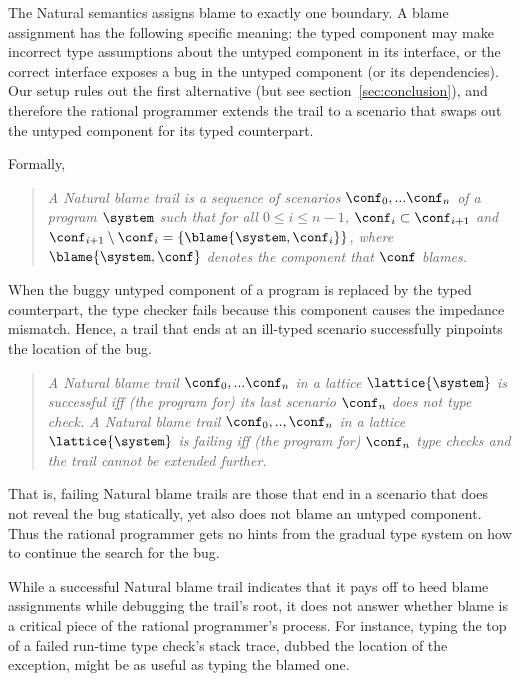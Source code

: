
The Natural semantics assigns blame to exactly one boundary.  A blame assignment
has the following specific meaning: the typed component may make incorrect type
assumptions about the untyped component in its interface, or the correct
interface exposes a bug in the untyped component (or its dependencies). Our setup rules out the first
alternative (but see section~\ref{sec:conclusion}), and therefore the rational
programmer extends the trail to a scenario that swaps out the untyped component
for its typed counterpart.

Formally,
\begin{quote}
\it A \emph{Natural blame trail} is a sequence of scenarios $\conf_0,...\conf_n$ of
a program $\system$ such that for all $0 \leq i \leq n - 1$, $\conf_i \subset
\conf_{i+1}$ and $\conf_{i+1} \setminus \conf_i =\{\blame{\system, \conf_i}\}$, where
$\blame{\system, \conf}$ denotes the component that $\conf$ blames.
\end{quote}

When the buggy untyped component of a program is replaced by the typed counterpart,
the type checker fails because this component causes the impedance mismatch. Hence, a
trail that ends at an ill-typed scenario successfully pinpoints the location of
the bug. 
\begin{quote}
\it A Natural blame trail $\conf_0,...\conf_n$ in a lattice $\lattice{\system}$ is
\emph{successful} iff (the program for) its last scenario $\conf_n$ does not type check.  A Natural
blame trail $\conf_0,..,\conf_n$ in a lattice $\lattice{\system}$ is \emph{failing}
iff (the program for) $\conf_n$ type checks and the trail cannot be extended further.
\end{quote}
That is, failing Natural blame trails are those that end in a scenario that does not reveal the bug statically, yet also does not blame
an untyped component. Thus the rational programmer gets
no hints from the gradual type system on how to continue the search for the bug.

While a successful Natural blame trail indicates that it 
pays off to heed blame assignments while debugging the trail's root, it does not answer whether
blame is a critical piece of the rational programmer's process.  For instance,
typing the top of a failed run-time type check's stack trace, dubbed the
location of the exception, might be as useful as typing the blamed one.

